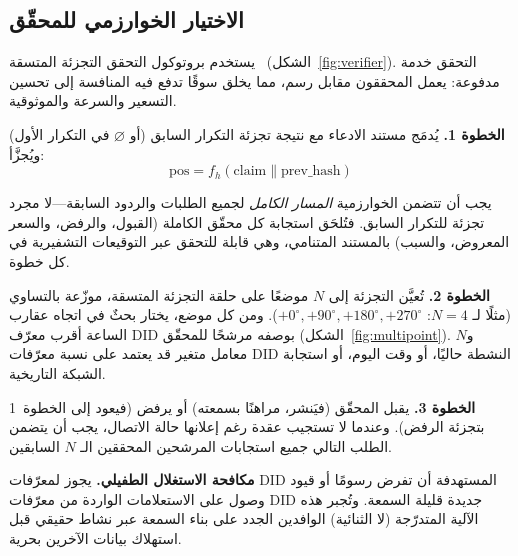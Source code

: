 \documentclass[11pt,a4paper,twocolumn]{article}
\begin{document}
\subsection{الاختيار الخوارزمي للمحقّق}

يستخدم بروتوكول التحقق التجزئة المتسقة~\cite{karger1997} (الشكل~\ref{fig:verifier}). التحقق خدمة مدفوعة: يعمل المحققون مقابل رسم، مما يخلق سوقًا تدفع فيه المنافسة إلى تحسين التسعير والسرعة والموثوقية.

\textbf{الخطوة 1.} يُدمَج مستند الادعاء مع نتيجة تجزئة التكرار السابق (أو $\varnothing$ في التكرار الأول) ويُجزَّأ:
\begin{equation}
\text{pos} = f_h(\text{claim} \| \text{prev\_hash})
\label{eq:hash}
\end{equation}

يجب أن تتضمن الخوارزمية \emph{المسار الكامل} لجميع الطلبات والردود السابقة---لا مجرد تجزئة للتكرار السابق. فتُلحَق استجابة كل محقّق الكاملة (القبول، والرفض، والسعر المعروض، والسبب) بالمستند المتنامي، وهي قابلة للتحقق عبر التوقيعات التشفيرية في كل خطوة.

\textbf{الخطوة 2.} تُعيَّن التجزئة إلى $N$ موضعًا على حلقة التجزئة المتسقة، موزّعة بالتساوي (مثلًا لـ $N=4$: $+0^{\circ}, +90^{\circ}, +180^{\circ}, +270^{\circ}$). ومن كل موضع، يختار بحثٌ في اتجاه عقارب الساعة أقرب معرّف DID بوصفه مرشحًا للمحقّق (الشكل~\ref{fig:multipoint}). و$N$ معامل متغير قد يعتمد على نسبة معرّفات DID النشطة حاليًا، أو وقت اليوم، أو استجابة الشبكة التاريخية.

\textbf{الخطوة 3.} يقبل المحقّق (فيَنشر، مراهنًا بسمعته) أو يرفض (فيعود إلى الخطوة~1 بتجزئة الرفض). وعندما لا تستجيب عقدة رغم إعلانها حالة الاتصال، يجب أن يتضمن الطلب التالي جميع استجابات المرشحين المحققين الـ $N$ السابقين.

\textbf{مكافحة الاستغلال الطفيلي.} يجوز لمعرّفات DID المستهدفة أن تفرض رسومًا أو قيود وصول على الاستعلامات الواردة من معرّفات DID جديدة قليلة السمعة. وتُجبر هذه الآلية المتدرّجة (لا الثنائية) الوافدين الجدد على بناء السمعة عبر نشاط حقيقي قبل استهلاك بيانات الآخرين بحرية.
\end{document}
